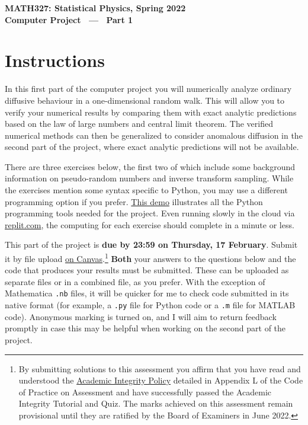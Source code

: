 \documentclass[12 pt]{article} %
\begin{document}
\newcommand{\thisunit}{MATH327 Project Part 1}
\newcommand{\moddate}{Last modified 3 Feb.~2022}
\begin{center}
  {\Large \textbf{MATH327: Statistical Physics, Spring 2022}} \\[12 pt]
  {\Large \textbf{Computer Project \ --- \ Part 1}} \\[24 pt]
\end{center}

\section*{Instructions}
In this first part of the computer project you will numerically analyze ordinary diffusive behaviour in a one-dimensional random walk.
This will allow you to verify your numerical results by comparing them with exact analytic predictions based on the law of large numbers and central limit theorem.
The verified numerical methods can then be generalized to consider anomalous diffusion in the second part of the project, where exact analytic predictions will not be available.

There are three exercises below, the first two of which include some background information on pseudo-random numbers and inverse transform sampling.
While the exercises mention some syntax specific to Python, you may use a different programming option if you prefer.
\href{https://tinyurl.com/math327demo}{This demo} illustrates all the Python programming tools needed for the project.
Even running slowly in the cloud via \href{https://replit.com/languages/python3}{replit.com}, the computing for each exercise should complete in a minute or less.

This part of the project is \textbf{due by 23:59 on Thursday, 17 February}.
Submit it by file upload \href{https://liverpool.instructure.com/courses/47333/assignments/178541}{on Canvas}.\footnote{By submitting solutions to this assessment you affirm that you have read and understood the \href{https://www.liverpool.ac.uk/media/livacuk/tqsd/code-of-practice-on-assessment/appendix_L_cop_assess.pdf}{Academic Integrity Policy} detailed in Appendix L of the Code of Practice on Assessment and have successfully passed the Academic Integrity Tutorial and Quiz.  The marks achieved on this assessment remain provisional until they are ratified by the Board of Examiners in June 2022.}
\textbf{Both} your answers to the questions below and the code that produces your results must be submitted.
These can be uploaded as separate files or in a combined file, as you prefer.
With the exception of Mathematica \texttt{.nb} files, it will be quicker for me to check code submitted in its native format (for example, a \texttt{.py} file for Python code or a \texttt{.m} file for MATLAB code).
Anonymous marking is turned on, and I will aim to return feedback promptly in case this may be helpful when working on the second part of the project.
\end{document}
